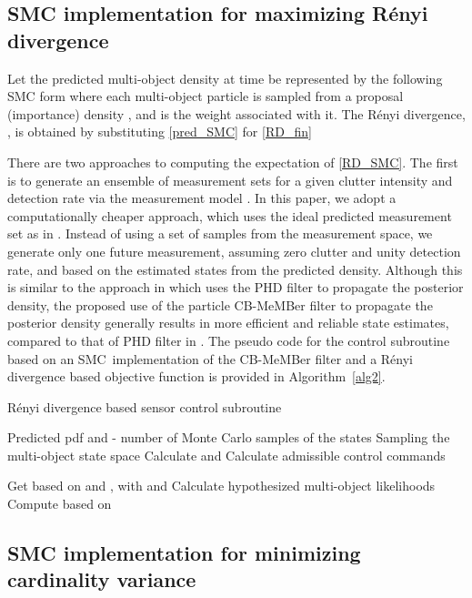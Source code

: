 \documentclass[twocolumn]{autart}
\begin{document}
\subsection{SMC implementation for maximizing R\'enyi divergence}
Let the predicted multi-object density at time  be represented by the following SMC form
where each multi-object particle  is sampled from a
proposal (importance) density , and  is the weight associated with it. The R\'enyi divergence, , is obtained by substituting \eqref{pred_SMC} for \eqref{RD_fin} 


There are two approaches to computing the expectation of \eqref{RD_SMC}. The
first is to generate an ensemble of measurement sets  for
a given clutter intensity and detection rate via the measurement model \cite {RV10}. In this paper, we adopt a computationally cheaper approach, which
uses the ideal predicted measurement set as in \cite{Mah04,RVC11}. Instead
of using a set of samples  from the measurement space, we generate only one future
measurement, assuming zero clutter and unity detection rate, and based on
the estimated states from the predicted density. Although this is similar to
the approach in \cite{RVC11} which uses the PHD filter to propagate the
posterior density, the proposed use of the particle CB-MeMBer filter to
propagate the posterior density generally results in more efficient and
reliable state estimates, compared to that of PHD filter in \cite{RVC11}. The pseudo code for the control subroutine based on an SMC\
implementation of the CB-MeMBer filter and a R\'{e}nyi divergence based objective function is
provided in Algorithm~\ref{alg2}.
\begin{algorithm}[htb]
\caption{R\'enyi divergence based sensor control subroutine}
\label{alg2}
\begin{algorithmic}[1]
    \Require Predicted pdf  and  - number of Monte Carlo samples of the states 
    \Ensure 
    \State Sampling the multi-object state space
    \Statex \quad \; 
    \State Calculate  and 
    \State Calculate admissible control commands
    
    \For{}
    \State Get  based on  and , with 
    \Statex \quad\; and 
    \State Calculate hypothesized multi-object likelihoods
    \Statex \quad\;
    \State Compute  based on 
    \EndFor
    \State 
\end{algorithmic}
\end{algorithm}

\subsection{SMC implementation for minimizing cardinality variance}
\end{document}
